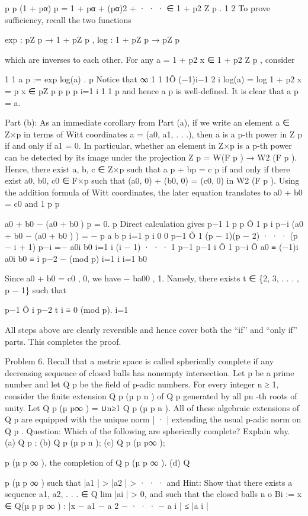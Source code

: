 \documentclass[UTF8,12pt]{ctexart}
\begin{document}
p p (1 + pα) p = 1 + pα + (pα)2 + · · · ∈ 1 + p2 Z p . 1 2 To prove sufficiency, recall the two functions

exp : pZ p → 1 + pZ p , log : 1 + pZ p → pZ p

which are inverses to each other. For any a = 1 + p2 x ∈ 1 + p2 Z p , consider

1 1 a p := exp log(a) . p Notice that ∞ 1 1 1Õ (−1)i−1 2 i log(a) = log 1 + p2 x = p x ∈ pZ p p p p i=1 i 1 1 p and hence a p is well-defined. It is clear that a p = a.

Part (b): As an immediate corollary from Part (a), if we write an element a ∈ Z×p in terms of Witt coordinates a = (a0, a1, . . .), then a is a p-th power in Z p if and only if a1 = 0. In particular, whether an element in Z×p is a p-th power can be detected by its image under the projection Z p = W(F p ) → W2 (F p ). Hence, there exist a, b, c ∈ Z×p such that a p + bp = c p if and only if there exist a0, b0, c0 ∈ F×p such that (a0, 0) + (b0, 0) = (c0, 0) in W2 (F p ). Using the addition formula of Witt coordinates, the later equation translates to a0 + b0 = c0 and 1 p p

a0 + b0 − (a0 + b0 ) p = 0. p Direct calculation gives p−1 1 p p Õ 1 p i p−i (a0 + b0 − (a0 + b0 ) ) = − p a b p i=1 p i 0 0 p−1 Õ 1 (p − 1)(p − 2) · · · (p − i + 1) p−i =− a0i b0 i=1 i (i − 1) · · · 1 p−1 p−1 i Õ 1 p−i Õ a0 ≡ (−1)i a0i b0 ≡ i p−2 − (mod p) i=1 i i=1 b0

Since a0 + b0 = c0 , 0, we have − ba00 , 1. Namely, there exists t ∈ \{2, 3, . . . , p − 1\} such that

p−1 Õ i p−2 t i ≡ 0 (mod p). i=1

All steps above are clearly reversible and hence cover both the “if” and “only if” parts. This completes the proof.

Problem 6. Recall that a metric space is called spherically complete if any decreasing sequence of closed balls has nonempty intersection. Let p be a prime number and let Q p be the field of p-adic numbers. For every integer n ≥ 1, consider the finite extension Q p (µ p n ) of Q p generated by all pn -th roots of unity. Let Q p (µ p∞ ) = ∪n≥1 Q p (µ p n ). All of these algebraic extensions of Q p are equipped with the unique norm | · | extending the usual p-adic norm on Q p . Question: Which of the following are spherically complete? Explain why. (a) Q p ; (b) Q p (µ p n ); (c) Q p (µ p∞ );

p (µ p ∞ ), the completion of Q p (µ p ∞ ). (d) Q

p (µ p ∞ ) such that |a1 | > |a2 | > · · · and Hint: Show that there exists a sequence a1, a2, . . . ∈ Q lim |ai | > 0, and such that the closed balls n o Bi := x ∈ Q(µ p p ∞ ) : |x − a1 − a 2 − · · · − a i | ≤ |a i |
\end{document}
